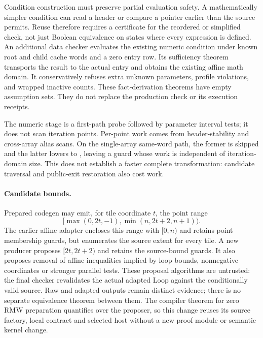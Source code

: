 Condition construction must preserve partial evaluation safety. A mathematically
simpler condition can read a header or compare a pointer earlier than the source
permits. Reuse therefore requires a certificate for the reordered or simplified
check, not just Boolean equivalence on states where every expression is defined.
An additional data checker evaluates the existing numeric condition under known
root and child cache words and a zero entry row. Its sufficiency theorem
transports the result to the actual entry and obtains the existing affine math
domain. It conservatively refuses extra unknown parameters, profile violations,
and wrapped inactive counts. These fact-derivation theorems have empty assumption
sets. They do not replace the production check or its execution receipts.

The numeric stage is a first-path probe followed by parameter interval tests;
it does not scan iteration points. Per-point work comes from header-stability
and cross-array alias scans. On the single-array same-word path, the former is
skipped and the latter lowers to , leaving a guard whose work is
independent of iteration-domain size. This does not establish a faster complete
transformation: candidate traversal and public-exit restoration also cost work.

\paragraph{Candidate bounds.}
Prepared codegen may emit, for tile coordinate $t$, the point range
\[
 [\max(0,2t,-1),\min(n,2t+2,n+1)).
\]
The earlier affine adapter encloses this range with $[0,n)$ and retains point
membership guards, but enumerates the source extent for every tile.
A new producer proposes $[2t,2t+2)$ and retains
the source-bound guards. It also proposes removal of affine inequalities
implied by loop bounds, nonnegative coordinates or stronger parallel tests.
These proposal algorithms are untrusted: the final checker revalidates the
actual adapted Loop against the conditionally valid source. Raw and adapted
outputs remain distinct evidence; there is no separate equivalence theorem
between them. The compiler theorem for zero RMW preparation quantifies over the
proposer, so this change reuses its source factory, local contract and selected
host without a new proof module or semantic kernel change.

